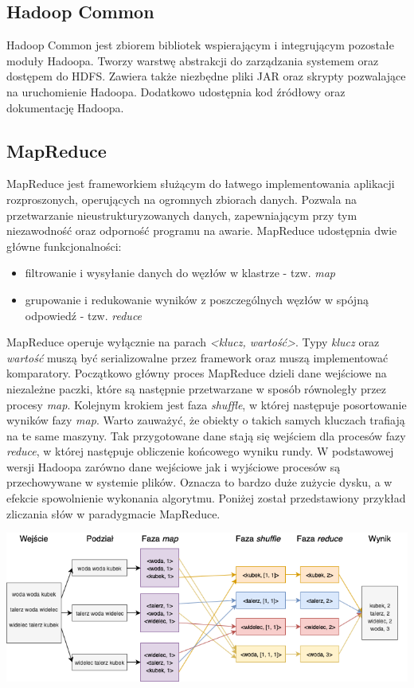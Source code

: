 \documentclass[licencjacka]{pracamgr}
\begin{document}
\subsection{Hadoop Common}

Hadoop Common jest zbiorem bibliotek wspierającym i integrującym pozostałe moduły Hadoopa. Tworzy warstwę abstrakcji do zarządzania systemem oraz dostępem do HDFS. Zawiera także niezbędne pliki JAR oraz skrypty pozwalające na uruchomienie Hadoopa. Dodatkowo udostępnia kod źródłowy oraz dokumentację Hadoopa.

\subsection{MapReduce}

MapReduce jest frameworkiem służącym do łatwego implementowania aplikacji rozproszonych, operujących na ogromnych zbiorach danych.  Pozwala na przetwarzanie nieustrukturyzowanych danych, zapewniającym przy tym niezawodność oraz odporność programu na awarie. MapReduce udostępnia dwie główne funkcjonalności:
\begin{itemize}
\item filtrowanie i wysyłanie danych do węzłów w klastrze - tzw. \textit{map}
\item grupowanie i redukowanie wyników z poszczególnych węzłów w spójną odpowiedź - tzw. \textit{reduce}
\end{itemize}

MapReduce operuje wyłącznie na parach \textit{<klucz, wartość>}. Typy \textit{klucz} oraz \textit{wartość} muszą być serializowalne przez framework oraz muszą implementować komparatory. Początkowo główny proces MapReduce dzieli dane wejściowe na niezależne paczki, które są następnie przetwarzane w sposób równoległy przez procesy \textit{map}. Kolejnym krokiem jest faza \textit{shuffle}, w której następuje posortowanie wyników fazy \textit{map}. Warto zauważyć, że obiekty o takich samych kluczach trafiają na te same maszyny. Tak przygotowane dane stają się wejściem dla procesów fazy \textit{reduce}, w której następuje obliczenie końcowego wyniku rundy. W podstawowej wersji Hadoopa zarówno dane wejściowe jak i wyjściowe procesów są przechowywane w systemie plików. Oznacza to bardzo duże zużycie dysku, a w efekcie spowolnienie wykonania algorytmu. Poniżej został przedstawiony przykład zliczania słów w paradygmacie MapReduce.

\includegraphics[width=15cm]{mapreduce_word_count.png}
\end{document}
